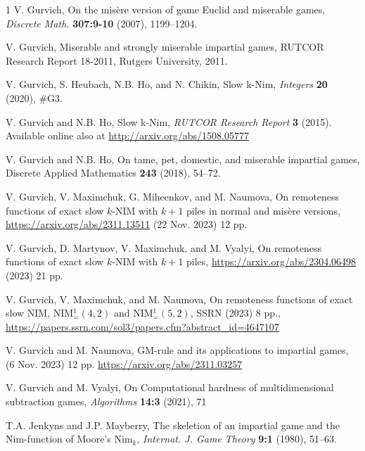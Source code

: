 \documentclass[10pt]{article}
\theoremstyle{definition}
\begin{document}
\begin{thebibliography}{1}
V. Gurvich, 
On the mis\`{e}re version of game Euclid and miserable games, 
{\it Discrete Math.} {\bf 307:9-10} (2007), 1199--1204.

 V. Gurvich, 
Miserable and strongly miserable impartial games, 
RUTCOR Research Report 18-2011, Rutgers University, 2011.

V. Gurvich, S. Heubach, N.B. Ho, and N. Chikin, 
Slow k-Nim, {\it Integers} {\bf20} (2020), \#G3.

V. Gurvich and N.B. Ho, Slow k-Nim, 
{\it RUTCOR Research Report} {\bf3} (2015). 
Available online also at
\url{http://arxiv.org/abs/1508.05777}

V. Gurvich and N.B. Ho,
On tame, pet, domestic, and miserable impartial games,
Discrete Applied Mathematics {\bf 243} (2018), 54--72.

V. Gurvich, V. Maximchuk, G. Miheenkov, and M. Naumova, 
On remoteness functions of exact slow $k$-NIM with 
$k+1$ piles in normal and mis\`ere versions, 
\url{https://arxiv.org/abs/2311.13511} 
(22 Nov. 2023) 12 pp.

V. Gurvich, D. Martynov, V. Maximchuk, and M. Vyalyi,  
On remoteness functions of exact slow $k$-NIM with $k+1$ piles,  
\url{https://arxiv.org/abs/2304.06498} (2023) 21 pp.  

V. Gurvich, V. Maximchuk, and M. Naumova,   
On remoteness functions 
of exact slow NIM, NIM$_=^1(4,2)$  and  NIM$_=^1(5,2)$,
SSRN (2023) 8 pp., 
\newline 
\url{https://papers.ssrn.com/sol3/papers.cfm?abstract_id=4647107}

V. Gurvich and M. Naumova,   
GM-rule and its applications to impartial games, 
(6 Nov. 2023) 12 pp. 
\url{https://arxiv.org/abs/2311.03257}

V. Gurvich and M. Vyalyi,  
On Computational hardness of multidimensional subtraction games, 
{\it Algorithms} {\bf 14:3} (2021), 71  


T.A. Jenkyns and J.P. Mayberry,
The skeletion of an impartial game
and the Nim-function of Moore's Nim$_k$, 
{\it Internat. J.  Game Theory} {\bf9:1} (1980), 51--63.


\end{thebibliography}
\end{document}
